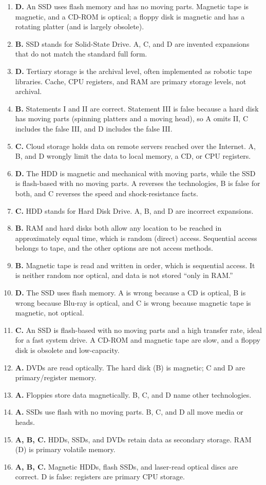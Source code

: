 \documentclass[11pt]{article}
\begin{document}
\begin{enumerate}[label=\textbf{Q\arabic*.}, leftmargin=*]
\item \textbf{D.} An SSD uses flash memory and has no moving parts. Magnetic
  tape is magnetic, and a CD-ROM is optical; a floppy disk is magnetic and
  has a rotating platter (and is largely obsolete).
\item \textbf{B.} SSD stands for Solid-State Drive. A, C, and D are invented
  expansions that do not match the standard full form.
\item \textbf{D.} Tertiary storage is the archival level, often implemented
  as robotic tape libraries. Cache, CPU registers, and RAM are primary
  storage levels, not archival.
\item \textbf{B.} Statements I and II are correct. Statement III is false
  because a hard disk has moving parts (spinning platters and a moving head),
  so A omits II, C includes the false III, and D includes the false III.
\item \textbf{C.} Cloud storage holds data on remote servers reached over the
  Internet. A, B, and D wrongly limit the data to local memory, a CD, or CPU
  registers.
\item \textbf{D.} The HDD is magnetic and mechanical with moving parts, while
  the SSD is flash-based with no moving parts. A reverses the technologies,
  B is false for both, and C reverses the speed and shock-resistance facts.
\item \textbf{C.} HDD stands for Hard Disk Drive. A, B, and D are incorrect
  expansions.
\item \textbf{B.} RAM and hard disks both allow any location to be reached in
  approximately equal time, which is random (direct) access. Sequential
  access belongs to tape, and the other options are not access methods.
\item \textbf{B.} Magnetic tape is read and written in order, which is
  sequential access. It is neither random nor optical, and data is not stored
  ``only in RAM.''
\item \textbf{D.} The SSD uses flash memory. A is wrong because a CD is
  optical, B is wrong because Blu-ray is optical, and C is wrong because
  magnetic tape is magnetic, not optical.
\item \textbf{C.} An SSD is flash-based with no moving parts and a high
  transfer rate, ideal for a fast system drive. A CD-ROM and magnetic tape
  are slow, and a floppy disk is obsolete and low-capacity.

\item \textbf{A.} DVDs are read optically. The hard disk (B) is magnetic; C and D are primary/register memory.
\item \textbf{A.} Floppies store data magnetically. B, C, and D name other technologies.
\item \textbf{A.} SSDs use flash with no moving parts. B, C, and D all move media or heads.
\item \textbf{A, B, C.} HDDs, SSDs, and DVDs retain data as secondary storage. RAM (D) is primary volatile memory.
\item \textbf{A, B, C.} Magnetic HDDs, flash SSDs, and laser-read optical discs are correct. D is false: registers are primary CPU storage.
\end{enumerate}
\def\JKSSBLessonID{10}\def\JKSSBAnswers{1}
\end{document}
